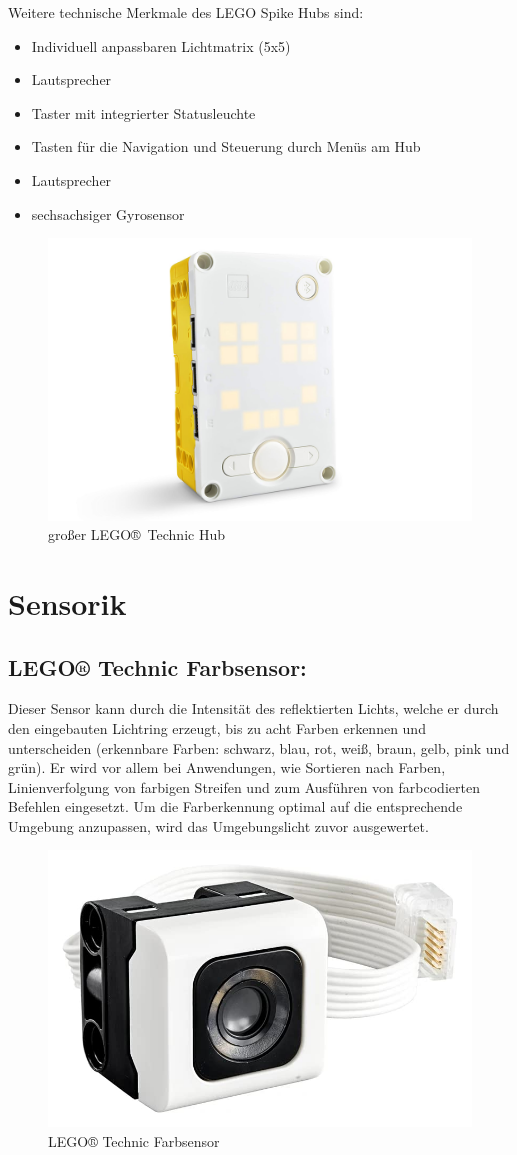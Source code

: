 Weitere technische Merkmale des LEGO Spike Hubs sind:
\begin{itemize}
	\item Individuell anpassbaren Lichtmatrix (5x5)
	\item Lautsprecher
	\item Taster mit integrierter Statusleuchte 
	\item Tasten für die Navigation und Steuerung durch Menüs am Hub 
	\item Lautsprecher
	\item sechsachsiger Gyrosensor 
\end{itemize} 

\begin{figure}[H]
	\centering
	\includegraphics[width=0.4\linewidth]{images/Hub}
	\caption{großer LEGO® Technic Hub}
	\label{fig:hub}
\end{figure}



\section{Sensorik} %
\subsection*{LEGO® Technic Farbsensor:}
Dieser Sensor kann durch die Intensität des reflektierten Lichts, welche er durch den eingebauten Lichtring erzeugt, bis zu acht Farben erkennen und unterscheiden (erkennbare Farben: schwarz, blau, rot, weiß, braun, gelb, pink und grün).  Er wird vor allem bei Anwendungen, wie Sortieren nach Farben, Linienverfolgung von farbigen Streifen und zum Ausführen von farbcodierten Befehlen eingesetzt. Um die Farberkennung optimal auf die entsprechende Umgebung anzupassen, wird das Umgebungslicht zuvor ausgewertet.

\begin{figure}[H]
	\centering
	\includegraphics[width=0.4\linewidth]{images/Farbsensor}
	\caption{LEGO® Technic Farbsensor}
	\label{fig:farbsensor}
\end{figure}


